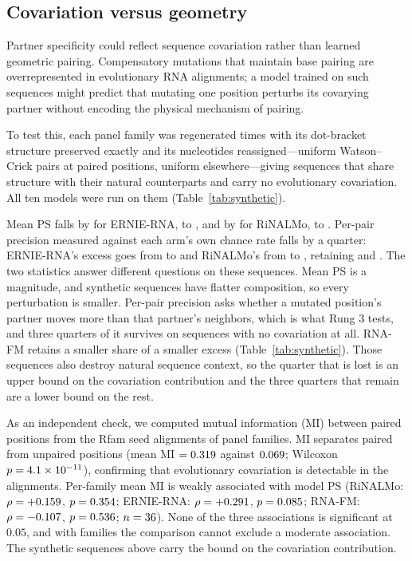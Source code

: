 \documentclass[11pt]{article}
\begin{document}
\subsection{Covariation versus geometry}
\label{sec:covariation-results}

Partner specificity could reflect sequence covariation rather than
learned geometric pairing. Compensatory mutations that maintain base
pairing are overrepresented in evolutionary RNA alignments; a model
trained on such sequences might predict that mutating one position
perturbs its covarying partner without encoding the physical mechanism
of pairing.

To test this, each panel family was regenerated \synPerFamily{} times with its
dot-bracket structure preserved exactly and its nucleotides reassigned---uniform
Watson--Crick pairs at paired positions, uniform elsewhere---giving \synN{}
sequences that share structure with their natural counterparts and carry no
evolutionary covariation. All ten models were run on them
(Table~\ref{tab:synthetic}).



Mean PS falls by \synPSDropErnieRNA{} for ERNIE-RNA, to \synPSErnieRNA{}, and
by \synPSDropRiNALMo{} for RiNALMo, to \synPSRiNALMo{}. Per-pair precision
measured against each arm's own chance rate falls by a quarter: ERNIE-RNA's
excess goes from \natExcessErnieRNA{} to \synExcessErnieRNA{} and RiNALMo's
from \natExcessRiNALMo{} to \synExcessRiNALMo{}, retaining
\synRetainedErnieRNA{} and \synRetainedRiNALMo{}. The two statistics answer
different questions on these sequences. Mean PS is a magnitude, and synthetic
sequences have flatter composition, so every perturbation is smaller. Per-pair
precision asks whether a mutated position's partner moves more than that
partner's neighbors, which is what Rung 3 tests, and three quarters of it
survives on sequences with no covariation at all. RNA-FM retains a smaller
share of a smaller excess (Table~\ref{tab:synthetic}). Those sequences also destroy
natural sequence context, so the quarter that is lost is an upper bound on the
covariation contribution and the three quarters that remain are a lower bound
on the rest.

As an independent check, we computed mutual information (MI) between
paired positions from the Rfam seed alignments of \miFamilies{} panel families.
MI separates paired from unpaired positions (mean MI $= 0.319$ against
$0.069$; Wilcoxon $p = 4.1 \times 10^{-11}$), confirming that evolutionary
covariation is detectable in the alignments. Per-family mean MI is
weakly associated with model PS (RiNALMo: $\rho = +0.159$,
$p = 0.354$; ERNIE-RNA: $\rho = +0.291$, $p = 0.085$;
RNA-FM: $\rho = -0.107$, $p = 0.536$; $n = 36$). None of the
three associations is significant at $0.05$, and with \miNRiNALMo{} families the
comparison cannot exclude a moderate association.
The synthetic sequences above carry the bound on the covariation contribution.
\end{document}
